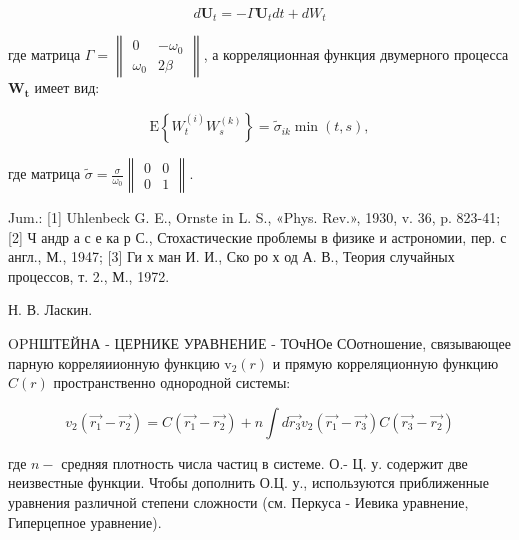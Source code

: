\documentclass[10pt]{article}
\begin{document}
\[

d \boldsymbol{U}_{t}=-\Gamma \boldsymbol{U}_{t} d t+d W_{t}

\]



где матрица $\Gamma=\left\|\begin{array}{cr}0 & -\omega_{0} \\ \omega_{0} & 2 \beta\end{array}\right\|$, а корреляционная функция двумерного процесса $\boldsymbol{W}_{\boldsymbol{t}}$ имеет вид:



\[

\mathrm{E}\left\{W_{t}^{(i)} W_{s}^{(k)}\right\}=\tilde{\sigma}_{i k} \min (t, s),

\]



где матрица $\tilde{\sigma}=\frac{\sigma}{\omega_{0}}\left\|\begin{array}{ll}0 & 0 \\ 0 & 1\end{array}\right\|$.



Jum.: [1] Uhlenbeck G. E., Ornste in L. S., «Phys. Rev.», 1930, v. 36, p. 823-41; [2] Ч андр а с е ка р С., Стохастические проблемы в физике и астрономии, пер. с англ., М., 1947; [3] Ги х ман И. И., Ско ро х од А. В., Теория случайных процессов, т. 2., М., 1972.



Н. В. Ласкин.



OPHШТЕЙНА - ЦЕРНИКЕ УРАВНЕНИЕ - ТОчНОе СОотношение, связывающее парную корреляиионную функцию $\mathrm{v}_{2}(r)$ и прямую корреляционную функцию $C(r)$ пространственно однородной системы:



\[

v_{2}\left(\overrightarrow{r_{1}}-\overrightarrow{r_{2}}\right)=C\left(\overrightarrow{r_{1}}-\overrightarrow{r_{2}}\right)+n \int d \overrightarrow{r_{3}} v_{2}\left(\overrightarrow{r_{1}}-\overrightarrow{r_{3}}\right) C\left(\overrightarrow{r_{3}}-\overrightarrow{r_{2}}\right)

\]



где $n-$ средняя плотность числа частиц в системе. О.- Ц. у. содержит две неизвестные функции. Чтобы дополнить О.Ц. у., используются приближенные уравнения различной степени сложности (см. Перкуса - Иевика уравнение, Гиперцепное уравнение).
\end{document}

